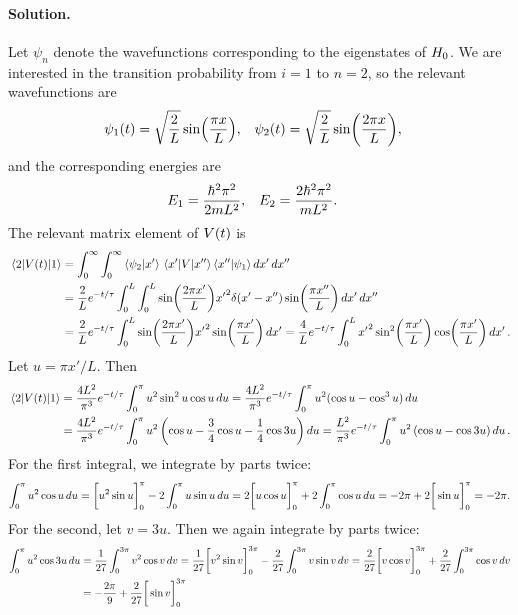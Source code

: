 \documentclass[11pt]{article}
\newcommand{\beq}{\begin{equation*}}
\newcommand{\eeq}{\end{equation*}}
\newenvironment{solution}
{
    \paragraph{Solution.}
    \ignorespaces
}
{
}
\begin{document}
\begin{solution}
	Let $\psi_n$ denote the wavefunctions corresponding to the eigenstates of $H_0$.  We are interested in the transition probability from $i = 1$ to $n = 2$, so the relevant wavefunctions are
	\begin{align*}
		\psi_1(t) &= \sqrt{\frac{2}{L}} \sin(\frac{\pi x}{L}), &
		\psi_2(t) &= \sqrt{\frac{2}{L}} \sin(\frac{2\pi x}{L}),
	\end{align*}
	and the corresponding energies are
	\begin{align*}
		E_1 &= \frac{\hbar^2 \pi^2}{2 m L^2}, &
		E_2 &= \frac{2 \hbar^2 \pi^2}{m L^2}.
	\end{align*}
	The relevant matrix element of $V(t)$ is
	\begin{align*}
		\mel{2}{V(t)}{1} &= \int_0^\infty \int_0^\infty \braket{\psi_2}{x'} \mel{x'}{V}{x''} \braket{x''}{\psi_1} \dd{x'} \dd{x''} \\
		&= \frac{2}{L} e^{-t / \tau} \int_0^L \int_0^L \sin(\frac{2\pi x'}{L}) {x'}^2 \delta(x' - x'') \sin(\frac{\pi x''}{L}) \dd{x'} \dd{x''} \\
		&= \frac{2}{L} e^{-t / \tau} \int_0^L \sin(\frac{2\pi x'}{L}) {x'}^2 \sin(\frac{\pi x'}{L}) \dd{x'}
		= \frac{4}{L} e^{-t / \tau} \int_0^L {x'}^2 \sin[2](\frac{\pi x'}{L}) \cos(\frac{\pi x'}{L}) \dd{x'}.
	\end{align*}
	Let $u = \pi x' / L$.  Then
	\begin{align*}
		\mel{2}{V(t)}{1} &= \frac{4 L^2}{\pi^3} e^{-t / \tau} \int_0^\pi u^2 \sin^2{u} \cos{u} \dd{u}
		= \frac{4 L^2}{\pi^3} e^{-t / \tau} \int_0^\pi u^2 (\cos{u} - \cos^3{u}) \dd{u} \\
		&= \frac{4 L^2}{\pi^3} e^{-t / \tau} \int_0^\pi u^2 \left( \cos{u} - \frac{3}{4} \cos{u} - \frac{1}{4} \cos{3u} \right) \dd{u}
		= \frac{L^2}{\pi^3} e^{-t / \tau} \int_0^\pi u^2 \left( \cos{u} - \cos{3u} \right) \dd{u}.
	\end{align*}
	For the first integral, we integrate by parts twice:
	\beq
		\intopi u^2 \cos{u} \du = \bigg[ u^2 \sin{u} \bigg]_0^\pi - 2 \intopi u \sin{u} \du
		= 2 \bigg[ u \cos{u} \bigg]_0^\pi + 2 \intopi \cos{u} \du
		= -2 \pi + 2 \bigg[ \sin{u} \bigg]_0^\pi
		= -2 \pi.
	\eeq
	For the second, let $v = 3u$.  Then we again integrate by parts twice:
	\begin{align*}
		\intopi u^2 \cos{3u} \du &= \frac{1}{27} \intoepi v^2 \cos{v} \ddv
		= \frac{1}{27} \bigg[ v^2 \sin{v} \bigg]_0^{3\pi} - \frac{2}{27} \intoepi v \sin{v} \ddv
		= \frac{2}{27} \bigg[ v \cos{v} \bigg]_0^{3\pi} + \frac{2}{27} \intoepi \cos{v} \ddv \\
		&= -\frac{2\pi}{9} + \frac{2}{27} \bigg[ \sin{v} \bigg]_0^{3\pi}

\end{align*}
\end{solution}
\end{document}
